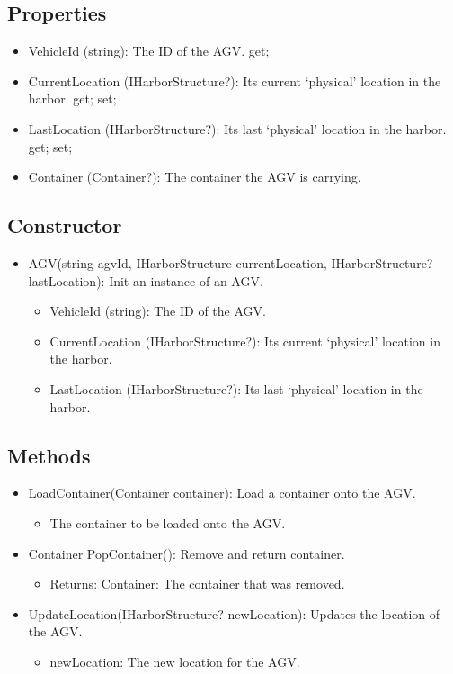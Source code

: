 \documentclass[12pt]{article}
\begin{document}
\subsection*{Properties}
    \begin{itemize}
        \item VehicleId (string): The ID of the AGV. {get;}
        \item CurrentLocation (IHarborStructure?): Its current `physical' location in the harbor. { get; set; }
        \item LastLocation (IHarborStructure?): Its last `physical' location in the harbor. { get; set; }
        \item Container (Container?): The container the AGV is carrying.
    \end{itemize}
\subsection*{Constructor}
\begin{itemize}
    \item AGV(string agvId, IHarborStructure currentLocation, IHarborStructure? lastLocation): Init an instance of an AGV.
    \begin{itemize}
        \item VehicleId (string): The ID of the AGV.
        \item CurrentLocation (IHarborStructure?): Its current `physical' location in the harbor.
        \item LastLocation (IHarborStructure?): Its last `physical' location in the harbor. 
    \end{itemize}
\end{itemize}

\subsection*{Methods}
\begin{itemize}
    \item LoadContainer(Container container): Load a container onto the AGV.
    \begin{itemize}
        \item The container to be loaded onto the AGV.
    \end{itemize}
    \item Container PopContainer(): Remove and return container.
    \begin{itemize}
        \item Returns: Container: The container that was removed.
    \end{itemize}
    \item UpdateLocation(IHarborStructure? newLocation): Updates the location of the AGV.
    \begin{itemize}
        \item newLocation: The new location for the AGV.
    \end{itemize}
\end{itemize}
\end{document}
